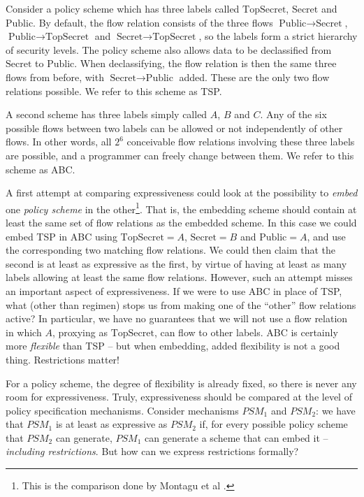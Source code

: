 Consider a policy scheme which has three labels called $\text{TopSecret}$, $\text{Secret}$ and $\text{Public}$.
      By default, the flow relation consists of the three flows 
      $\text{Public} \rightarrow \text{Secret}$, $\text{Public} \rightarrow \text{TopSecret}$
      and $\text{Secret} \rightarrow \text{TopSecret}$, so the labels form a strict hierarchy
      of security levels. The policy scheme also allows data to be declassified from $\text{Secret}$
      to $\text{Public}$. When declassifying, the flow relation is then the same three flows from before,
      with $\text{Secret} \rightarrow \text{Public}$ added. These are the only two flow relations
      possible. We refer to this scheme as TSP.

A second scheme has three labels simply called $A$, $B$ and $C$. Any of the six possible
    flows between two labels can be allowed or not independently of other flows. In other words,
    all $2^6$ conceivable flow relations involving these three labels are possible, and a
    programmer can freely change between them. We refer to this scheme as ABC.

A first attempt at comparing expressiveness could look at the possibility to \emph{embed} one
\emph{policy scheme} in the other\footnote{This is the comparison done by Montagu et al \cite{Montagu13}.}.
That is, the embedding scheme should contain at least the same set of flow relations as the embedded scheme.
In this case we could embed TSP in ABC using
$\text{TopSecret} = A$, $\text{Secret} = B$ and $\text{Public} = A$, and use the corresponding
two matching flow relations. We could then claim that the second is at least as
expressive as the first, by virtue of having at least as many labels allowing at least
the same flow relations. However, such an attempt misses an important aspect of expressiveness.
If we were to use ABC in place of TSP, what (other than regimen) stops us from making
one of the ``other'' flow relations active? In particular, we have no guarantees that we will
not use a flow relation in which $A$, proxying as $\text{TopSecret}$, can flow to other labels.
ABC is certainly more \emph{flexible} than TSP -- but when embedding, added
flexibility is not a good thing. Restrictions matter!

For a policy scheme, the degree of flexibility is already fixed, so there is never any room
for expressiveness. Truly, expressiveness should be compared at the level of policy specification
mechanisms. Consider mechanisms $PSM_1$ and $PSM_2$: we have that $PSM_1$ is at least as expressive as 
$PSM_2$ if, for every possible policy scheme that $PSM_2$ can generate, $PSM_1$ can generate a scheme that
can embed it -- \emph{including restrictions}. But how can we express restrictions formally?


